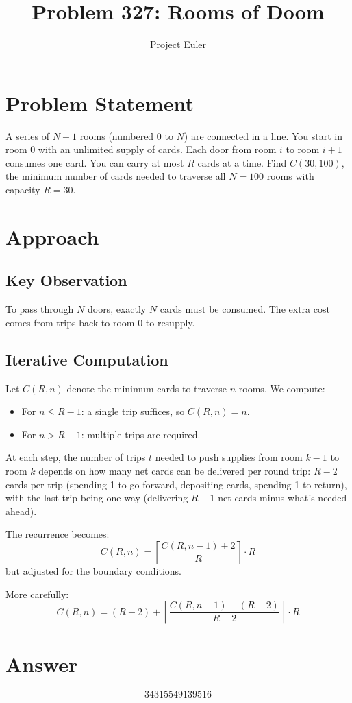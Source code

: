 \documentclass{article}
\title{Problem 327: Rooms of Doom}
\author{Project Euler}
\date{}
\begin{document}
\maketitle

\section{Problem Statement}
A series of $N+1$ rooms (numbered 0 to $N$) are connected in a line. You start in room 0 with an unlimited supply of cards. Each door from room $i$ to room $i+1$ consumes one card. You can carry at most $R$ cards at a time. Find $C(30, 100)$, the minimum number of cards needed to traverse all $N = 100$ rooms with capacity $R = 30$.

\section{Approach}

\subsection{Key Observation}
To pass through $N$ doors, exactly $N$ cards must be consumed. The extra cost comes from trips back to room 0 to resupply.

\subsection{Iterative Computation}
Let $C(R, n)$ denote the minimum cards to traverse $n$ rooms. We compute:
\begin{itemize}
    \item For $n \leq R - 1$: a single trip suffices, so $C(R, n) = n$.
    \item For $n > R - 1$: multiple trips are required.
\end{itemize}

At each step, the number of trips $t$ needed to push supplies from room $k-1$ to room $k$ depends on how many net cards can be delivered per round trip: $R - 2$ cards per trip (spending 1 to go forward, depositing cards, spending 1 to return), with the last trip being one-way (delivering $R - 1$ net cards minus what's needed ahead).

The recurrence becomes:
\[
C(R, n) = \left\lceil \frac{C(R, n-1) + 2}{R} \right\rceil \cdot R
\]
but adjusted for the boundary conditions.

More carefully:
\[
C(R, n) = (R - 2) + \left\lceil \frac{C(R, n-1) - (R - 2)}{R - 2} \right\rceil \cdot R
\]

\section{Answer}

\[
\boxed{34315549139516}
\]
\end{document}
